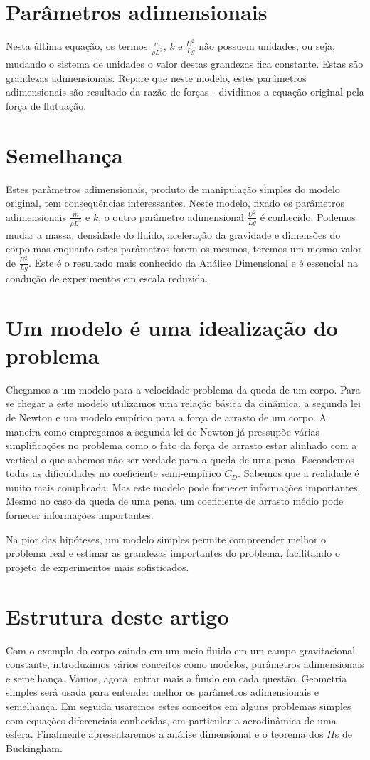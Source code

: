 \section{Parâmetros adimensionais}
Nesta última equação, os termos $\frac{m}{\rho L^3}$, $k$ e $\frac{U^2}{L g}$ não possuem unidades, ou seja, mudando o sistema de unidades o valor destas grandezas fica constante. Estas são grandezas adimensionais. Repare que neste modelo, estes parâmetros adimensionais são resultado da razão de forças - dividimos a equação original pela força de flutuação.

\section{Semelhança}
Estes parâmetros adimensionais, produto de manipulação simples do modelo original, tem consequências interessantes. Neste modelo, fixado os parâmetros adimensionais $\frac{m}{\rho L^3}$ e $k$, o outro parâmetro adimensional $\frac{U^2}{Lg}$ é conhecido. Podemos mudar a massa, densidade do fluido, aceleração da gravidade e dimensões do corpo mas enquanto estes parâmetros forem os mesmos, teremos um mesmo valor de $\frac{U^2}{Lg}$. Este é o resultado mais conhecido da Análise Dimensional e é essencial na condução de experimentos em escala reduzida.

\section{Um modelo é uma idealização do problema}
Chegamos a um modelo para a velocidade  problema da queda de um corpo. Para se chegar a este modelo utilizamos uma relação básica da dinâmica, a segunda lei de Newton e um modelo empírico para a força de arrasto de um corpo. A maneira como empregamos a segunda lei de Newton já pressupõe várias simplificações no problema como o fato da força de arrasto estar alinhado com a vertical o que sabemos não ser verdade para a queda de uma pena. Escondemos todas as dificuldades no coeficiente semi-empírico $C_D$. Sabemos que a realidade é muito mais complicada. Mas este modelo pode fornecer informações importantes. Mesmo no caso da queda de uma pena, um coeficiente de arrasto médio pode fornecer informações importantes.

Na pior das hipóteses, um modelo simples permite compreender melhor o problema real e estimar as grandezas importantes do problema, facilitando o projeto de experimentos mais sofisticados.

\section{Estrutura deste artigo}

Com o exemplo do corpo caindo em um meio fluido em um campo gravitacional constante, introduzimos vários conceitos como modelos, parâmetros adimensionais e semelhança. Vamos, agora, entrar mais a fundo em cada questão. Geometria simples será usada para entender melhor os parâmetros adimensionais e semelhança. Em seguida usaremos estes conceitos em alguns problemas simples com equações diferenciais conhecidas, em particular a aerodinâmica de uma esfera. Finalmente apresentaremos a análise dimensional e o teorema dos $\Pi$s de Buckingham.


